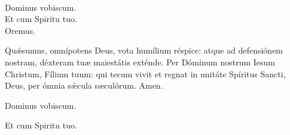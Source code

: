 \\
  \rubric{\Vbar}Dominus vobiscum.
\\
  \rubric{\Rbar}Et cum Spiritu tuo.
\\
Oremus.

Quǽsumus, omnípotens Deus, vota humílium réspice: atque ad defensiónem nostram, déxteram tuæ maiestátis exténde. Per Dóminum nostrum Iesum Christum, Fílium tuum: qui tecum vivit et regnat in unitáte Spíritus Sancti, Deus, per ómnia sǽcula sæculórum. \rubric{\Rbar} Amen.

  \rubric{\Vbar}Dominus vobiscum.

  \rubric{\Rbar}Et cum Spiritu tuo.

